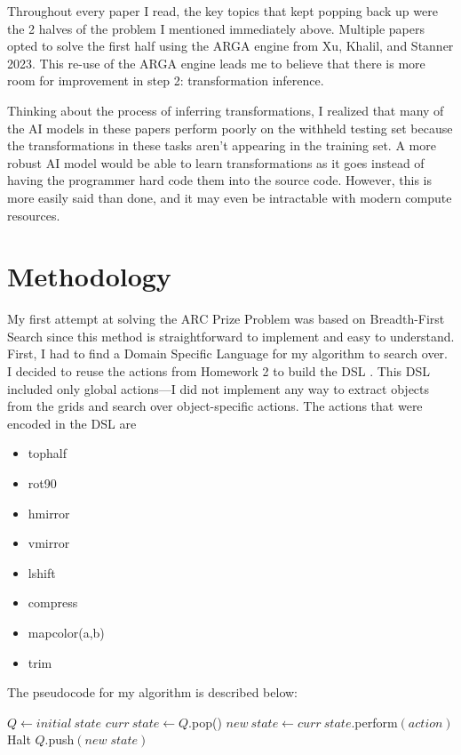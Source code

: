 \documentclass[letterpaper]{article} %
\begin{document}
\bigskip

Throughout every paper I read, the key topics that kept popping back up were the 2 halves of the problem I mentioned immediately above. Multiple papers opted to solve the first half using the ARGA engine from Xu, Khalil, and Stanner 2023. This re-use of the ARGA engine leads me to believe that there is more room for improvement in step 2: transformation inference.

Thinking about the process of inferring transformations, I realized that many of the AI models in these papers perform poorly on the withheld testing set because the transformations in these tasks aren't appearing in the training set. A more robust AI model would be able to learn transformations as it goes instead of having the programmer hard code them into the source code. However, this is more easily said than done, and it may even be intractable with modern compute resources.

\section{Methodology}
My first attempt at solving the ARC Prize Problem was based on Breadth-First Search since this method is straightforward to implement and easy to understand. First, I had to find a Domain Specific Language for my algorithm to search over. I decided to reuse the actions from Homework 2 to build the DSL \cite{maclellan_arc_homework}. This DSL included only global actions---I did not implement any way to extract objects from the grids and search over object-specific actions. The actions that were encoded in the DSL are
\begin{itemize}
    \item tophalf
    \item rot90
    \item hmirror
    \item vmirror
    \item lshift
    \item compress
    \item mapcolor(a,b)
    \item trim
\end{itemize}
The pseudocode for my algorithm is described below:
\begin{algorithmic}
    \STATE $Q \gets initial \: state$
        \STATE $curr \: state \gets Q$.pop()
            \STATE $new \: state \gets curr \: state$.perform$(action)$
                \STATE Halt
            \ELSE
                \STATE $Q$.push$(new \; state)$
            \ENDIF
        \ENDFOR
    \ENDWHILE
\end{algorithmic}
\end{document}
